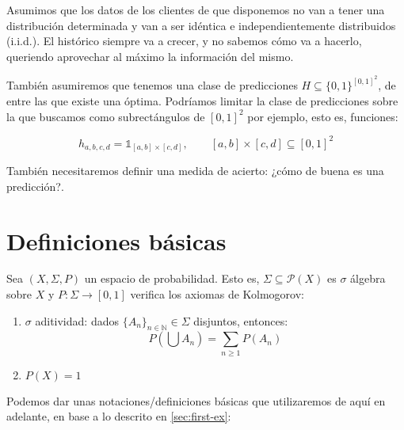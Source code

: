 Asumimos que los datos de los clientes de que disponemos no van a tener una distribución determinada y
van a ser idéntica e independientemente distribuidos (i.i.d.). El histórico siempre va a crecer, y no sabemos cómo va a hacerlo, queriendo aprovechar
al máximo la información del mismo.

También asumiremos que tenemos una clase de predicciones $H \subseteq \{0,1\}^{[0,1]^2}$, de entre las que existe
una óptima. Podríamos limitar la clase de predicciones sobre la que buscamos como subrectángulos de $[0,1]^2$ por ejemplo, 
esto es, funciones:

\[h_{a,b,c,d} = \mathds{1}_{[a,b]\times[c,d]}, \qquad [a,b]\times [c,d] \subseteq [0,1]^2\]


También necesitaremos definir una medida de acierto: ¿cómo de buena es una predicción?.

\section{Definiciones básicas}
\label{sec:defs}

Sea $(X, \Sigma, P)$ un espacio de probabilidad. Esto es, $\Sigma \subseteq \mathcal{P}(X)$ es $\sigma$ álgebra sobre $X$ y 
$P: \Sigma \rightarrow [0,1]$ verifica los axiomas de Kolmogorov:

\begin{enumerate}[i]
 \item $\sigma$ aditividad: dados $\{A_n\}_{n\in \mathbb{N}} \in \Sigma$ disjuntos, entonces: 
 \[P \left(\bigcup A_n\right) = \sum_{n\ge 1} P(A_n)\]
 \item $P(X) = 1$
\end{enumerate}

Podemos dar unas notaciones/definiciones básicas que utilizaremos de aquí en adelante, en base a lo descrito en \ref{sec:first-ex}:

